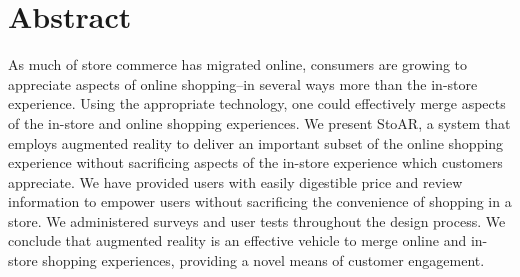 
\section{Abstract}

As much of store commerce has migrated online, consumers are growing to appreciate aspects of online shopping--in several ways more than the in-store experience.  Using the appropriate technology, one could effectively merge aspects of the in-store and online shopping experiences.  We present StoAR, a system that employs augmented reality to deliver an important subset of the online shopping experience without sacrificing aspects of the in-store experience which customers appreciate.  We have provided users with easily digestible price and review information to empower users without sacrificing the convenience of shopping in a store.  We administered surveys and user tests throughout the design process.  We conclude that augmented reality is an effective vehicle to merge online and in-store shopping experiences, providing a novel means of customer engagement.
